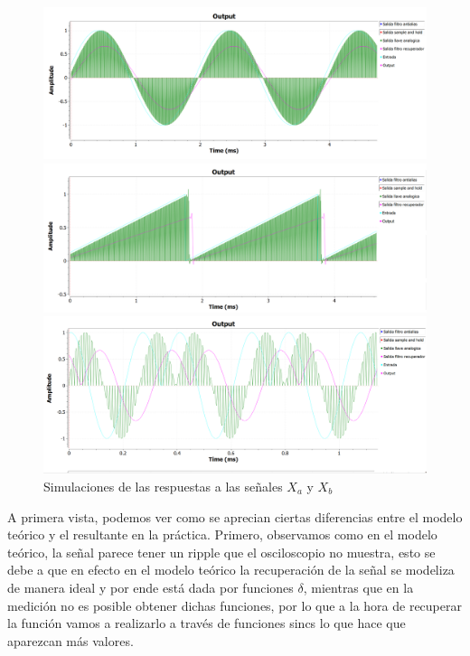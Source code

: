 \documentclass[../../ASSD_TP1_G7.tex]{subfiles}
\begin{document}
\begin{figure}[H]

\begin{centering}
\includegraphics[scale=0.5]{Imagenes/simulacion_llave_seno_a.PNG}
\par\end{centering}
\begin{centering}
\includegraphics[scale=0.5]{Imagenes/simulacion_llave_diente_a.PNG}
\par\end{centering}
\begin{centering}
\includegraphics[scale=0.5]{Imagenes/simulacion_llave_senoraro_a.PNG}\caption{Simulaciones de las respuestas a las señales $X_{a}$ y $X_{b}$ }
\par\end{centering}
\end{figure}

A primera vista, podemos ver como se aprecian ciertas diferencias
entre el modelo teórico y el resultante en la práctica. Primero, observamos
como en el modelo teórico, la señal parece tener un ripple que el
osciloscopio no muestra, esto se debe a que en efecto en el modelo
teórico la recuperación de la señal se modeliza de manera ideal y por ende está dada por funciones $\delta$,
mientras que en la medición no es posible obtener dichas funciones, por lo que a la hora de recuperar la función vamos a realizarlo a través de funciones sincs lo que hace que
aparezcan más valores.
\end{document}
